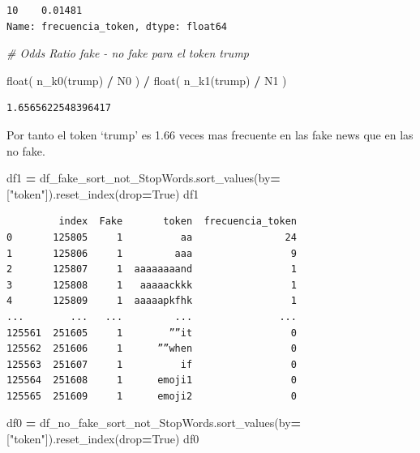 \documentclass[
  11pt,
  a4paper,
]{article}
\newenvironment{Shaded}{\begin{snugshade}}{\end{snugshade}}
\newcommand{\BuiltInTok}[1]{#1}
\newcommand{\CommentTok}[1]{\textcolor[rgb]{0.56,0.35,0.01}{\textit{#1}}}
\newcommand{\NormalTok}[1]{#1}
\newcommand{\OperatorTok}[1]{\textcolor[rgb]{0.81,0.36,0.00}{\textbf{#1}}}
\newcommand{\StringTok}[1]{\textcolor[rgb]{0.31,0.60,0.02}{#1}}
\newcommand{\VariableTok}[1]{\textcolor[rgb]{0.00,0.00,0.00}{#1}}
\begin{document}
\begin{verbatim}
10    0.01481
Name: frecuencia_token, dtype: float64
\end{verbatim}

\begin{Shaded}
\begin{Highlighting}[]
\CommentTok{\# Odds Ratio fake {-} no fake para el token \textquotesingle{}trump\textquotesingle{}}

\BuiltInTok{float}\NormalTok{( n\_k0(}\StringTok{\textquotesingle{}trump\textquotesingle{}}\NormalTok{) }\OperatorTok{/}\NormalTok{ N0 ) }\OperatorTok{/} \BuiltInTok{float}\NormalTok{( n\_k1(}\StringTok{\textquotesingle{}trump\textquotesingle{}}\NormalTok{) }\OperatorTok{/}\NormalTok{ N1 )}
\end{Highlighting}
\end{Shaded}

\begin{verbatim}
1.6565622548396417
\end{verbatim}

Por tanto el token `trump' es 1.66 veces mas frecuente en las fake news
que en las no fake.

\begin{Shaded}
\begin{Highlighting}[]
\NormalTok{df1 }\OperatorTok{=}\NormalTok{ df\_fake\_sort\_not\_StopWords.sort\_values(by}\OperatorTok{=}\NormalTok{[}\StringTok{"token"}\NormalTok{]).reset\_index(drop}\OperatorTok{=}\VariableTok{True}\NormalTok{)}
\NormalTok{df1}
\end{Highlighting}
\end{Shaded}

\begin{verbatim}
         index  Fake       token  frecuencia_token
0       125805     1          aa                24
1       125806     1         aaa                 9
2       125807     1  aaaaaaaand                 1
3       125808     1   aaaaackkk                 1
4       125809     1  aaaaapkfhk                 1
...        ...   ...         ...               ...
125561  251605     1        ””it                 0
125562  251606     1      ””when                 0
125563  251607     1          if                 0
125564  251608     1      emoji1                 0
125565  251609     1      emoji2                 0
\end{verbatim}

\begin{Shaded}
\begin{Highlighting}[]
\NormalTok{df0 }\OperatorTok{=}\NormalTok{ df\_no\_fake\_sort\_not\_StopWords.sort\_values(by}\OperatorTok{=}\NormalTok{[}\StringTok{"token"}\NormalTok{]).reset\_index(drop}\OperatorTok{=}\VariableTok{True}\NormalTok{)}
\NormalTok{df0}
\end{Highlighting}
\end{Shaded}
\end{document}

